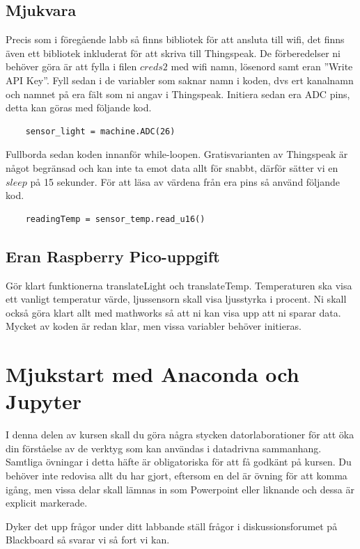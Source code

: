 \documentclass{article}
\begin{document}
\subsection{Mjukvara}
Precis som i föregående labb så finns bibliotek för att ansluta till wifi, det finns även ett bibliotek inkluderat för att skriva till Thingspeak. De förberedelser ni behöver göra är att fylla i filen $creds2$ med wifi namn, lösenord samt eran ''Write API Key''. Fyll sedan i de variabler som saknar namn i koden, dvs ert kanalnamn och namnet på era fält som ni angav i Thingspeak. Initiera sedan era ADC pins, detta kan göras med följande kod.
\begin{verbatim}
    sensor_light = machine.ADC(26)
\end{verbatim}
Fullborda sedan koden innanför while-loopen. Gratisvarianten av Thingspeak är något begränsad och kan inte ta emot data allt för snabbt, därför sätter vi en $sleep$ på 15 sekunder. För att läsa av värdena från era pins så använd följande kod.
\begin{verbatim}
    readingTemp = sensor_temp.read_u16() 
\end{verbatim}
\subsection{Eran Raspberry Pico-uppgift}
Gör klart funktionerna translateLight och translateTemp. Temperaturen ska visa ett vanligt temperatur värde, ljussensorn skall visa ljusstyrka i procent. Ni skall också göra klart allt med mathworks så att ni kan visa upp att ni sparar data. Mycket av koden är redan klar, men vissa variabler behöver initieras.

\pagebreak


\section{Mjukstart med Anaconda och Jupyter}
I denna delen av kursen skall du göra några stycken datorlaborationer för att öka din förståelse av de verktyg som kan användas i datadrivna sammanhang. 
Samtliga övningar i detta häfte är obligatoriska för att få godkänt på kursen. Du behöver inte redovisa allt du har gjort, eftersom en del är övning för att komma igång, men vissa delar skall lämnas in som Powerpoint eller liknande och dessa är explicit markerade.

Dyker det upp frågor under ditt labbande ställ frågor i diskussionsforumet på Blackboard så svarar vi så fort vi kan.
\end{document}
